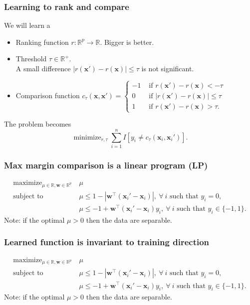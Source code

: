\documentclass{beamer}
\DeclareMathOperator*{\maximize}{maximize}
\DeclareMathOperator*{\minimize}{minimize}
\newcommand{\RR}{\mathbb R}
\begin{document}
\begin{frame}
  \frametitle{Learning to rank and compare}
  We will learn a
  \begin{itemize}
  \item Ranking function $r:\RR^p\rightarrow\RR$. Bigger is better.
  \item Threshold $\tau\in\RR^+$. \\A small difference
    $|r(\mathbf x')-r(\mathbf x)|\leq \tau$ is not significant.
  \item Comparison function $c_\tau(\mathbf x, \mathbf x') =
  \begin{cases}
    -1 & \text{ if }r(\mathbf x')-r(\mathbf x) < -\tau\\
    0 & \text{ if }|r(\mathbf x')-r(\mathbf x)|\leq \tau\\
    1 & \text{ if }r(\mathbf x')-r(\mathbf x) > \tau.
  \end{cases}
$
\end{itemize}
The problem becomes
$$\minimize_{r,\tau} \sum_{i=1}^n 
I\left[ y_i\neq c_\tau(\mathbf x_i, \mathbf x_i') \right].$$
\end{frame}

\begin{frame}
  \frametitle{Max margin comparison is a linear program (LP)}
  
  \vskip -2.2cm
  \begin{equation*}
  \begin{aligned}
    \maximize_{\mu\in\RR, \mathbf w\in\RR^p}\ & \mu \\
    \text{subject to}\ & 
    \mu \leq 1-|\mathbf w^\intercal (\mathbf x_i' - \mathbf x_i)|,\
    \forall\  i\text{ such that }y_i=0,\\
    &\mu \leq -1 +  
    \mathbf w^\intercal(\mathbf x_i'-\mathbf x_i)y_i,
    \ \forall\ i\text{ such that }y_i\in\{-1,1\}.
  \end{aligned}
\end{equation*}
Note: if the optimal $\mu>0$ then the data are separable.
\end{frame}

\begin{frame}
  \frametitle{Learned function is invariant to training direction}
  
  \vskip -2.2cm
  \begin{equation*}
  \begin{aligned}
    \maximize_{\mu\in\RR, \mathbf w\in\RR^p}\ & \mu \\
    \text{subject to}\ & 
    \mu \leq 1-|\mathbf w^\intercal (\mathbf x_i' - \mathbf x_i)|,\
    \forall\  i\text{ such that }y_i=0,\\
    &\mu \leq -1 +  
    \mathbf w^\intercal(\mathbf x_i'-\mathbf x_i)y_i,
    \ \forall\ i\text{ such that }y_i\in\{-1,1\}.
  \end{aligned}
\end{equation*}
Note: if the optimal $\mu>0$ then the data are separable.
\end{frame}
\end{document}

